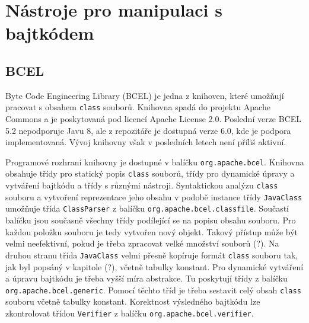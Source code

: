 \chapter{Nástroje pro manipulaci s bajtkódem}\label{Tools}




\section{BCEL}\label{ToolsBCEL}



Byte Code Engineering Library (BCEL) \cite{BCEL} je jedna z knihoven, které umožňují pracovat s obsahem \texttt{class} souborů. Knihovna spadá do projektu Apache Commons a je poskytovaná pod licencí Apache License 2.0. Poslední verze BCEL 5.2 nepodporuje Javu 8, ale z repozitáře je dostupná verze 6.0, kde je podpora implementovaná. Vývoj knihovny však v posledních letech není příliš aktivní. 

Programové rozhraní knihovny je dostupné v balíčku \texttt{org.apache.bcel}. Knihovna obsahuje třídy pro statický popis \texttt{class} souborů, třídy pro dynamické úpravy a vytváření bajtkódu a třídy s různými nástroji. Syntaktickou analýzu \texttt{class} souboru a vytvoření reprezentace jeho obsahu v podobě instance třídy \texttt{JavaClass} umožňuje třída \texttt{ClassParser} z balíčku \texttt{org.apache.bcel.classfile}. Součastí balíčku jsou současně všechny třídy podílející se na popisu obsahu souboru. Pro každou položku souboru je tedy vytvořen nový objekt. Takový přístup může být velmi neefektivní, pokud je třeba zpracovat velké množství souborů (?). Na druhou stranu třída \texttt{JavaClass} velmi přesně kopíruje formát \texttt{class} souboru tak, jak byl popsáný v kapitole (?), včetně tabulky konstant.
Pro dynamické vytváření a úpravu bajtkódu je třeba vyšší míra abstrakce. Tu poskytují třídy z balíčku \texttt{org.apache.bcel.generic}. Pomocí těchto tříd je třeba sestavit celý obsah \texttt{class} souboru včetně tabulky konstant. Korektnost výsledného bajtkódu lze zkontrolovat třídou \texttt{Verifier} z balíčku \texttt{org.apache.bcel.verifier}.

